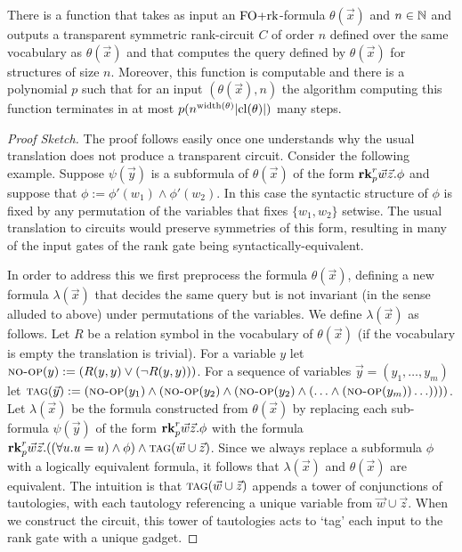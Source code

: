 \documentclass[a4paper,UKenglish]{lipics-v2018}
\begin{document}
\begin{lemma}
  There is a function that takes as input an $\text{\upshape FO+rk}$-formula $\theta(\vec{x})$
  and $n \in \mathbb{N}$ and outputs a transparent symmetric rank-circuit $C$ of
  order $n$ defined over the same vocabulary as $\theta(\vec{x})$ and that
  computes the query defined by $\theta(\vec{x})$ for structures of size $n$.
  Moreover, this function is computable and there is a polynomial $p$ such that
  for an input $(\theta(\vec{x}), n)$ the algorithm computing this function
  terminates in at most $p(n^{\mathrm{width}(\theta)}\vert \mathrm{cl}(\theta) \vert)$ many
  steps.
  \label{lem:translating-FOrk}
  
\end{lemma}
\begin{proof}[Proof Sketch]
  The proof follows easily once one understands why the usual translation does
  not produce a transparent circuit. Consider the following example. Suppose
  $\psi(\vec{y})$ is a subformula of $\theta(\vec{x})$ of the form $\text{\textbf{rk}}^r_p
  \vec{w} \vec{z} . \phi$ and suppose that $\phi := \phi'(w_1) \land
  \phi'(w_2)$. In this case the syntactic structure of $\phi$ is fixed by any
  permutation of the variables that fixes $\{w_1, w_2\}$ setwise. The usual
  translation to circuits would preserve symmetries of this form, resulting in
  many of the input gates of the rank gate being syntactically-equivalent.
  
  In order to address this we first preprocess the formula $\theta(\vec{x})$,
  defining a new formula $\lambda (\vec{x})$ that decides the same query but is
  not invariant (in the sense alluded to above) under permutations of the
  variables. We define $\lambda(\vec{x})$ as follows. Let $R$ be a relation
  symbol in the vocabulary of $\theta(\vec{x})$ (if the vocabulary is empty the
  translation is trivial). For a variable $y$ let ${\normalfont\textsc{no-op}}(y) := (R(y, y)
  \lor (\neg R(y, y)))$. For a sequence of variables $\vec{y} = (y_1, \ldots,
  y_m)$ let ${\normalfont\textsc{tag}} (\vec{y}) := ({\normalfont\textsc{no-op}}(y_1) \land ({\normalfont\textsc{no-op}}(y_2) \land
  ( {\normalfont\textsc{no-op}}(y_2) \land ( \ldots \land ({\normalfont\textsc{no-op}}(y_m)) \ldots))))$. Let
  $\lambda (\vec{x})$ be the formula constructed from $\theta(\vec{x})$ by
  replacing each sub-formula $\psi(\vec{y})$ of the form $\text{\textbf{rk}}^r_p \vec{w}
  \vec{z} . \phi$ with the formula $\text{\textbf{rk}}^r_p \vec{w}\vec{z} . ((\forall u . u =
  u) \land \phi) \land {\normalfont\textsc{tag}}(\vec{w} \cup \vec{z})$. Since we always replace
  a subformula $\phi$ with a logically equivalent formula, it follows that
  $\lambda (\vec{x})$ and $\theta (\vec{x})$ are equivalent. The intuition is
  that ${\normalfont\textsc{tag}}(\vec{w} \cup \vec{z})$ appends a tower of conjunctions of
  tautologies, with each tautology referencing a unique variable from $\vec{w}
  \cup \vec{z}$. When we construct the circuit, this tower of tautologies acts
  to `tag' each input to the rank gate with a unique gadget.


\end{proof}
\end{document}
